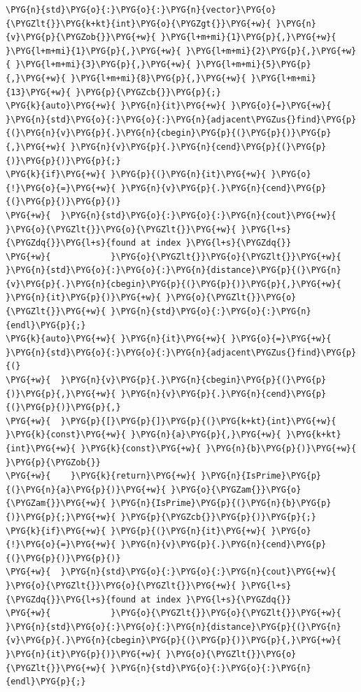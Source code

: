 \begin{itemize}
\begin{codeblockbg}
\begin{Verbatim}[commandchars=\\\{\},breaklines=true,breakanywhere=true,fontsize=\codefont,xleftmargin=17bp]
\PYG{n}{std}\PYG{o}{:}\PYG{o}{:}\PYG{n}{vector}\PYG{o}{\PYGZlt{}}\PYG{k+kt}{int}\PYG{o}{\PYGZgt{}}\PYG{+w}{ }\PYG{n}{v}\PYG{p}{\PYGZob{}}\PYG{+w}{ }\PYG{l+m+mi}{1}\PYG{p}{,}\PYG{+w}{ }\PYG{l+m+mi}{1}\PYG{p}{,}\PYG{+w}{ }\PYG{l+m+mi}{2}\PYG{p}{,}\PYG{+w}{ }\PYG{l+m+mi}{3}\PYG{p}{,}\PYG{+w}{ }\PYG{l+m+mi}{5}\PYG{p}{,}\PYG{+w}{ }\PYG{l+m+mi}{8}\PYG{p}{,}\PYG{+w}{ }\PYG{l+m+mi}{13}\PYG{+w}{ }\PYG{p}{\PYGZcb{}}\PYG{p}{;}
\PYG{k}{auto}\PYG{+w}{ }\PYG{n}{it}\PYG{+w}{ }\PYG{o}{=}\PYG{+w}{ }\PYG{n}{std}\PYG{o}{:}\PYG{o}{:}\PYG{n}{adjacent\PYGZus{}find}\PYG{p}{(}\PYG{n}{v}\PYG{p}{.}\PYG{n}{cbegin}\PYG{p}{(}\PYG{p}{)}\PYG{p}{,}\PYG{+w}{ }\PYG{n}{v}\PYG{p}{.}\PYG{n}{cend}\PYG{p}{(}\PYG{p}{)}\PYG{p}{)}\PYG{p}{;}
\PYG{k}{if}\PYG{+w}{ }\PYG{p}{(}\PYG{n}{it}\PYG{+w}{ }\PYG{o}{!}\PYG{o}{=}\PYG{+w}{ }\PYG{n}{v}\PYG{p}{.}\PYG{n}{cend}\PYG{p}{(}\PYG{p}{)}\PYG{p}{)}
\PYG{+w}{  }\PYG{n}{std}\PYG{o}{:}\PYG{o}{:}\PYG{n}{cout}\PYG{+w}{ }\PYG{o}{\PYGZlt{}}\PYG{o}{\PYGZlt{}}\PYG{+w}{ }\PYG{l+s}{\PYGZdq{}}\PYG{l+s}{found at index }\PYG{l+s}{\PYGZdq{}}
\PYG{+w}{            }\PYG{o}{\PYGZlt{}}\PYG{o}{\PYGZlt{}}\PYG{+w}{ }\PYG{n}{std}\PYG{o}{:}\PYG{o}{:}\PYG{n}{distance}\PYG{p}{(}\PYG{n}{v}\PYG{p}{.}\PYG{n}{cbegin}\PYG{p}{(}\PYG{p}{)}\PYG{p}{,}\PYG{+w}{ }\PYG{n}{it}\PYG{p}{)}\PYG{+w}{ }\PYG{o}{\PYGZlt{}}\PYG{o}{\PYGZlt{}}\PYG{+w}{ }\PYG{n}{std}\PYG{o}{:}\PYG{o}{:}\PYG{n}{endl}\PYG{p}{;}
\PYG{k}{auto}\PYG{+w}{ }\PYG{n}{it}\PYG{+w}{ }\PYG{o}{=}\PYG{+w}{ }\PYG{n}{std}\PYG{o}{:}\PYG{o}{:}\PYG{n}{adjacent\PYGZus{}find}\PYG{p}{(}
\PYG{+w}{  }\PYG{n}{v}\PYG{p}{.}\PYG{n}{cbegin}\PYG{p}{(}\PYG{p}{)}\PYG{p}{,}\PYG{+w}{ }\PYG{n}{v}\PYG{p}{.}\PYG{n}{cend}\PYG{p}{(}\PYG{p}{)}\PYG{p}{,}
\PYG{+w}{  }\PYG{p}{[}\PYG{p}{]}\PYG{p}{(}\PYG{k+kt}{int}\PYG{+w}{ }\PYG{k}{const}\PYG{+w}{ }\PYG{n}{a}\PYG{p}{,}\PYG{+w}{ }\PYG{k+kt}{int}\PYG{+w}{ }\PYG{k}{const}\PYG{+w}{ }\PYG{n}{b}\PYG{p}{)}\PYG{+w}{ }\PYG{p}{\PYGZob{}}
\PYG{+w}{    }\PYG{k}{return}\PYG{+w}{ }\PYG{n}{IsPrime}\PYG{p}{(}\PYG{n}{a}\PYG{p}{)}\PYG{+w}{ }\PYG{o}{\PYGZam{}}\PYG{o}{\PYGZam{}}\PYG{+w}{ }\PYG{n}{IsPrime}\PYG{p}{(}\PYG{n}{b}\PYG{p}{)}\PYG{p}{;}\PYG{+w}{ }\PYG{p}{\PYGZcb{}}\PYG{p}{)}\PYG{p}{;}
\PYG{k}{if}\PYG{+w}{ }\PYG{p}{(}\PYG{n}{it}\PYG{+w}{ }\PYG{o}{!}\PYG{o}{=}\PYG{+w}{ }\PYG{n}{v}\PYG{p}{.}\PYG{n}{cend}\PYG{p}{(}\PYG{p}{)}\PYG{p}{)}
\PYG{+w}{  }\PYG{n}{std}\PYG{o}{:}\PYG{o}{:}\PYG{n}{cout}\PYG{+w}{ }\PYG{o}{\PYGZlt{}}\PYG{o}{\PYGZlt{}}\PYG{+w}{ }\PYG{l+s}{\PYGZdq{}}\PYG{l+s}{found at index }\PYG{l+s}{\PYGZdq{}}
\PYG{+w}{            }\PYG{o}{\PYGZlt{}}\PYG{o}{\PYGZlt{}}\PYG{+w}{ }\PYG{n}{std}\PYG{o}{:}\PYG{o}{:}\PYG{n}{distance}\PYG{p}{(}\PYG{n}{v}\PYG{p}{.}\PYG{n}{cbegin}\PYG{p}{(}\PYG{p}{)}\PYG{p}{,}\PYG{+w}{ }\PYG{n}{it}\PYG{p}{)}\PYG{+w}{ }\PYG{o}{\PYGZlt{}}\PYG{o}{\PYGZlt{}}\PYG{+w}{ }\PYG{n}{std}\PYG{o}{:}\PYG{o}{:}\PYG{n}{endl}\PYG{p}{;}
\end{Verbatim}
\end{codeblockbg}


\end{itemize}
